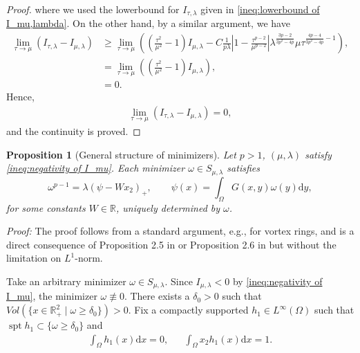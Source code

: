 \documentclass[11pt,letterpaper]{amsart}
\newtheorem{prop}[thm]{Proposition}
\theoremstyle{definition}
\theoremstyle{remark}
\newcommand{\R}{\mathbb{R}}
\newcommand{\spt}{\operatorname{spt}}
\numberwithin{equation}{section}
\begin{document}
\begin{proof}
    where we used the lowerbound for $I_{\tau,\lambda}$ given in \eqref{ineq:lowerbound of I_mu,lambda}. On the other hand, by a similar argument, we have 
    \begin{align*}
        \lim_{\tau\rightarrow\mu}\left( I_{\tau,\lambda} - I_{\mu,\lambda}\right) 
        & \geq  \lim_{\tau\rightarrow\mu}\left( \left(\frac{\tau^2}{\mu^2} -1\right)I_{\mu,\lambda} - C\frac{1}{p \lambda}\left| 1 - \frac{\tau^{p-2}}{\mu^{p-2}} \right|\lambda^{\frac{3p-2}{3p^2-4p}}\mu \tau^{\frac{4p-4}{3p^2-4p}-1} \right), \\
        & = \lim_{\tau\rightarrow\mu}\left( \left(\frac{\tau^2}{\mu^2} -1\right)I_{\mu,\lambda} \right), \\
        & =0.
    \end{align*}
    Hence, 
    \begin{align*}
        \lim_{\tau\rightarrow\mu}\left( I_{\tau,\lambda} - I_{\mu,\lambda}\right) =0,
    \end{align*}
    and the continuity is proved.
    
\end{proof}



\begin{prop}[General structure of minimizers]
\label{prop:general structure}
Let $p>1$, $(\mu,\lambda)$ satisfy \eqref{ineq:negativity of I_mu}. Each minimizer $\omega \in S_{\mu,\lambda}$ satisfies
\begin{equation}
\label{eqn:general structure of minimizer}
\omega^{p-1} = \lambda(\psi -W x_{2})_+, \qquad 
\psi (x) = \int_{\Omega}G(x,y)\omega (y)\mathrm{d}y,
\end{equation}
for some constants $W \in \R$, uniquely determined by $\omega$.
\end{prop}
\noindent\textit{Proof: } The proof follows from a standard argument, e.g., \cite{friedman1982variational, friedman1981vortex} for vortex rings, and is a direct consequence of Proposition 2.5 in \cite{abe2022stability} or Proposition 2.6 in \cite{Dong2026StabilityOV} but without the limitation on $L^1$-norm.

Take an arbitrary minimizer $\omega \in S_{\mu,\lambda}$. Since $I_{\mu,\lambda}< 0$ by \eqref{ineq:negativity of I_mu}, the minimizer $\omega\not\equiv 0$. There exists a $\delta_{0} > 0$ such that $Vol(\{x\in \R^2_+\mid \omega \geq \delta_{0}\}) > 0$. Fix a compactly supported $h_{1}\in L^{\infty}(\Omega)$ such that $\spt h_{1}\subset \{\omega \geq \delta_{0}\}$ and
\begin{align*}
    \int_{\Omega}h_{1}(x)\mathrm{d}x = 0, && \int_{\Omega}x_{2}h_{1}(x)\mathrm{d}x = 1.
\end{align*}
\end{document}
